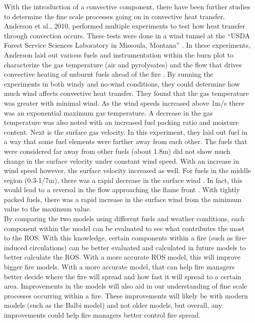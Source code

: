 \documentclass{article}
\begin{document}
\indent With the introduction of a convective component, there have been further studies to determine the fine scale processes going on in convective heat transfer. Anderson et al., 2010, performed multiple experiments to test how heat transfer through convection occurs. These tests were done in a wind tunnel at the “USDA Forest Service Sciences Laboratory in Missoula, Montana” \citep{Anderson2010}. In these experiments, Anderson laid out various fuels and instrumentation within the burn plot to characterize the gas temperature (air and pyrolysates) and the flow that drives convective heating of unburnt fuels ahead of the fire \citep{Anderson2010}. By running the experiments in both windy and no-wind conditions, they could determine how much wind affects convective heat transfer. They found that the gas temperature was greater with minimal wind. As the wind speeds increased above 1m/s there was an exponential maximum gas temperature. A decrease in the gas temperature was also noted with an increased fuel packing ratio and moisture content. Next is the surface gas velocity. In this experiment, they laid out fuel in a way that some fuel elements were farther away from each other. The fuels that were considered far away from other fuels (about 1.8m) did not show much change in the surface velocity under constant wind speed. With an increase in wind speed however, the surface velocity increased as well. For fuels in the middle region (0.3-1/7m), there was a rapid decrease in the surface wind \citep{Anderson2010}. In fact, this would lead to a reversal in the flow approaching the flame front \citep{Anderson2010}. With tightly packed fuels, there was a rapid increase in the surface wind from the minimum value to the maximum value. \\
\indent By comparing the two models using different fuels and weather conditions, each component within the model can be evaluated to see what contributes the most to the ROS. With this knowledge, certain components within a fire (such as fire-induced circulations) can be better evaluated and calculated in future models to better calculate the ROS. With a more accurate ROS model, this will improve bigger fire models. With a more accurate model, that can help fire managers better decide where the fire will spread and how fast it will spread to a certain area. Improvements in the models will also aid in our understanding of fine scale processes occurring within a fire. These improvements will likely be with modern models (such as the Balbi model) and not older models, but overall, any improvements could help fire managers better control fire spread. 
\end{document}
